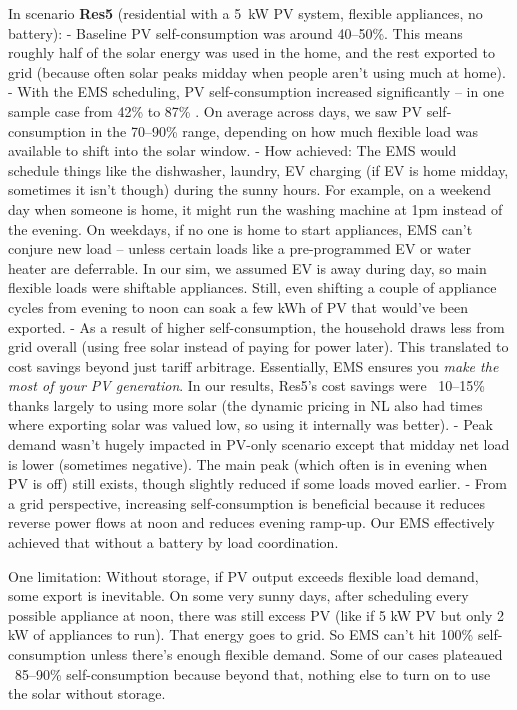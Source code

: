 \documentclass[12pt,a4paper]{article}
\begin{document}
In scenario \textbf{Res5} (residential with a 5~kW PV system, flexible appliances, no battery):
- Baseline PV self-consumption was around 40–50\%. This means roughly half of the solar energy was used in the home, and the rest exported to grid (because often solar peaks midday when people aren’t using much at home).
- With the EMS scheduling, PV self-consumption increased significantly – in one sample case from 42\% to 87\% \cite{TostadoVeliz2023}. On average across days, we saw PV self-consumption in the 70–90\% range, depending on how much flexible load was available to shift into the solar window.
- How achieved: The EMS would schedule things like the dishwasher, laundry, EV charging (if EV is home midday, sometimes it isn’t though) during the sunny hours. For example, on a weekend day when someone is home, it might run the washing machine at 1pm instead of the evening. On weekdays, if no one is home to start appliances, EMS can’t conjure new load – unless certain loads like a pre-programmed EV or water heater are deferrable. In our sim, we assumed EV is away during day, so main flexible loads were shiftable appliances. Still, even shifting a couple of appliance cycles from evening to noon can soak a few kWh of PV that would’ve been exported.
- As a result of higher self-consumption, the household draws less from grid overall (using free solar instead of paying for power later). This translated to cost savings beyond just tariff arbitrage. Essentially, EMS ensures you \emph{make the most of your PV generation}. In our results, Res5’s cost savings were ~10–15\% thanks largely to using more solar (the dynamic pricing in NL also had times where exporting solar was valued low, so using it internally was better).
- Peak demand wasn’t hugely impacted in PV-only scenario except that midday net load is lower (sometimes negative). The main peak (which often is in evening when PV is off) still exists, though slightly reduced if some loads moved earlier.
- From a grid perspective, increasing self-consumption is beneficial because it reduces reverse power flows at noon and reduces evening ramp-up. Our EMS effectively achieved that without a battery by load coordination.

One limitation: Without storage, if PV output exceeds flexible load demand, some export is inevitable. On some very sunny days, after scheduling every possible appliance at noon, there was still excess PV (like if 5 kW PV but only 2 kW of appliances to run). That energy goes to grid. So EMS can’t hit 100\% self-consumption unless there’s enough flexible demand. Some of our cases plateaued ~85–90\% self-consumption because beyond that, nothing else to turn on to use the solar without storage.
\end{document}

